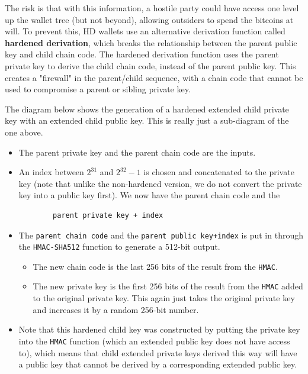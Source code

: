 \documentclass{article}
\newcounter{code}[section]
\begin{document}
    The risk is that with this information, a hostile party could have access one level up the wallet tree (but not beyond), allowing outsiders to spend the bitcoins at will. To prevent this, HD wallets use an alternative derivation function called \textbf{hardened derivation}, which breaks the relationship between the parent public key and child chain code. The hardened derivation function uses the parent private key to derive the child chain code, instead of the parent public key. This creates a "firewall" in the parent/child sequence, with a chain code that cannot be used to compromise a parent or sibling private key.

    The diagram below shows the generation of a hardened extended child private key with an extended child public key. This is really just a sub-diagram of the one above.

    \begin{itemize}
      \item The parent private key and the parent chain code are the inputs.
      \item An index between $2^{31}$ and $2^{32}-1$ is chosen and concatenated to the private key (note that unlike the non-hardened version, we do not convert the private key into a public key first). We now have the parent chain code and the
      \begin{lstlisting}
        parent private key + index
      \end{lstlisting}
      \item The \texttt{parent chain code} and the \texttt{parent public key+index} is put in through the \texttt{HMAC-SHA512} function to generate a 512-bit output.
      \begin{itemize}
        \item The new chain code is the last 256 bits of the result from the \texttt{HMAC}.
        \item The new private key is the first 256 bits of the result from the \texttt{HMAC} added to the original private key. This again just takes the original private key and increases it by a random 256-bit number.
      \end{itemize}
      \item Note that this hardened child key was constructed by putting the private key into the \texttt{HMAC} function (which an extended public key does not have access to), which means that child extended private keys derived this way will have a public key that cannot be derived by a corresponding extended public key.
    \end{itemize}
\end{document}
